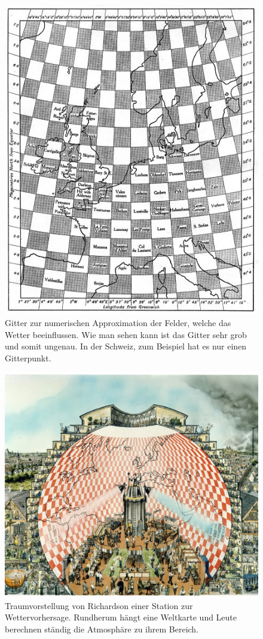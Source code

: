 \begin{figure}
	\centering
	\includegraphics{eingeteilte_Karte.jpg}
	\caption{Gitter zur numerischen Approximation der Felder, welche das Wetter beeinflussen.
		Wie man sehen kann ist das Gitter sehr grob und somit ungenau.
		In der Schweiz, zum Beispiel hat es nur einen Gitterpunkt. 
		}
	\label{bild:karteEuropa}
\end{figure}

\begin{figure}
	\centering
	\includegraphics[width=\textwidth]{Richardsons_Traum.jpg}
	\caption{Traumvorstellung von Richardson einer Station zur Wettervorhersage. 
	Rundherum hängt eine Weltkarte und Leute berechnen ständig die Atmosphäre zu ihrem Bereich.}
	\label{bild:richardsonsTraum}
\end{figure}

